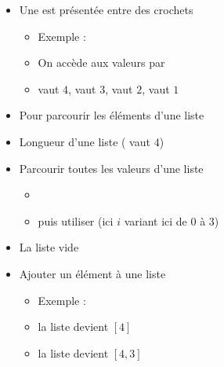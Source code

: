 \begin{frame}
\begin{itemize}
  \item Une  est présentée entre des crochets
\pause
  \begin{itemize}
    \item Exemple : 
\pause
    \item On accède aux valeurs par 
\pause
    \item {} vaut $4$,   vaut $3$,    vaut $2$,   vaut $1$
  \end{itemize}
\pause

  \item Pour parcourir les éléments d'une liste 
\pause  
  \item Longueur d'une liste   ( vaut $4$)
\pause
  \item Parcourir toutes les valeurs d'une liste 
  \begin{itemize}
    \item {}
    \item puis utiliser  (ici $i$ variant ici de $0$ à $3$)
  \end{itemize}

\pause  
  \item La liste vide  \codeinline{[]}
\pause  
  \item Ajouter un élément à une liste
  \begin{itemize}
    \item Exemple : 
\pause
    \item  {} \quad  la liste  devient $[4]$
\pause
    \item {}  \quad  la liste  devient $[4,3]$
  \end{itemize}
\end{itemize}
\end{frame}


